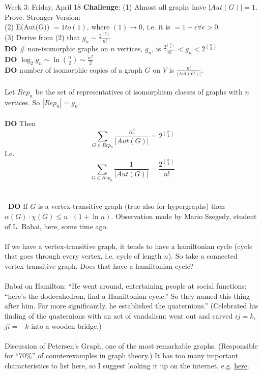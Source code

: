 \documentclass[12pt]{article}
\theoremstyle{remark}
\begin{document}
\begin{section}{Week 3: Friday, April 18}
\textbf{Challenge}: (1) Almost all graphs have $|Aut(G)| = 1$. Prove. Stronger Version: 
\\
(2) E(Aut(G)) $= 1 to (1)$, where $(1) \to 0$, i.e. it is $= 1+ \epsilon \forall \epsilon > 0$.\\
(3) Derive from (2) that $g_n \sim \frac{2^{n \choose 2}}{n!}$
\\\textbf{DO} $\#$ non-isomorphic graphs on $n$ vertices, $g_n$, is $\frac{2^{n \choose 2}}{n!}<g_n<2^{n \choose 2}$
\\
\textbf{DO} $\log_2 g_n \sim \ln { n \choose 2} \sim \frac{n^2}{2}$
\\
\textbf{DO} number of isomorphic copies of a graph $G$ on $V$ is $\frac{n!}{|Aut(G)|}$.
\\\\
Let $Rep_n$ be the set of representatives of isomorphism classes of graphs with $n$ vertices. So $|Rep_n| = g_n$.
\\\\
\textbf{DO}
Then $$\sum_{G \in Rep_n} \frac{n!}{|Aut(G)|} = 2^{n \choose 2}$$
I.e.
$$\sum_{G \in Rep_n} \frac{1}{|Aut(G)|} = \frac{2^{n \choose 2}}{n!}$$
\\\\\
\textbf{DO} If $G$ is a vertex-transitive graph (true also for hypergraphs) then $\alpha(G) \cdot \chi(G) \leq n \cdot (1+ \ln n)$. Observation made by Mario Szegedy, student of L. Babai, here, some time ago.
\\\\
If we have a vertex-transitive graph, it tends to have a hamiltonian cycle (cycle that goes through every vertex, i.e. cycle of length $n$). So take a connected vertex-transitive graph. Does that have a hamiltonian cycle?
\\\\
Babai on Hamilton: ``He went around, entertaining people at social functions: ``here's the dodecahedron, find a Hamiltonian cycle.'' So they named this thing after him. Far more significantly, he established the quaternions.'' (Celebrated his finding of the quaternions with an act of vandalism: went out and carved $ij=k$,$ji = -k$ into a wooden bridge.)
\\\\
Discussion of Petersen's Graph, one of the most remarkable graphs. (Responsible for ``70\%'' of counterexamples in graph theory.) It has too many important characteristics to list here, so I suggest looking it up on the internet, e.g. \href{http://en.wikipedia.org/wiki/Petersen\_graph}{here}.
\\\\

\end{section}
\end{document}
